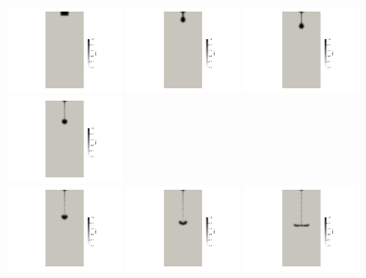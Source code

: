\begin{center}
\includegraphics[width=3.4cm]{python_codes/fieldstone_67/dripping/converted_0012.jpg}
\includegraphics[width=3.4cm]{python_codes/fieldstone_67/dripping/converted_0013.jpg}
\includegraphics[width=3.4cm]{python_codes/fieldstone_67/dripping/converted_0014.jpg}
\includegraphics[width=3.4cm]{python_codes/fieldstone_67/dripping/converted_0015.jpg}\\
\includegraphics[width=3.4cm]{python_codes/fieldstone_67/dripping/converted_0016.jpg}
\includegraphics[width=3.4cm]{python_codes/fieldstone_67/dripping/converted_0017.jpg}
\includegraphics[width=3.4cm]{python_codes/fieldstone_67/dripping/converted_0018.jpg}

\end{center}
